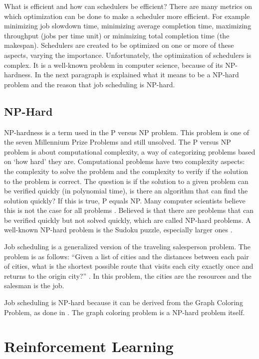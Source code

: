 What is efficient and how can schedulers be efficient? There are many metrics
on which optimization can be done to make a scheduler more efficient. For
example minimizing job slowdown time, minimizing average completion time,
maximizing throughput (jobs per time unit) or minimizing total completion time
(the makespan). Schedulers are created to be optimized on one or more of these
aspects, varying the importance. Unfortunately, the optimization of schedulers
is complex. It is a well-known problem in computer science, because of its
NP-hardness. In the next paragraph is explained what it means to be a NP-hard
problem and the reason that job scheduling is NP-hard.


\subsection{NP-Hard}

NP-hardness is a term used in the P versus NP problem. This problem is one of
the seven Millennium Prize Problems \cite{carlson2006} and still unsolved. The
P versus NP problem is about computational complexity, a way of categorizing
problems based on `how hard' they are. Computational problems have two
complexity aspects: the complexity to solve the problem and the complexity to
verify if the solution to the problem is correct. The question is if the
solution to a given problem can be verified quickly (in polynomial time), is
there an algorithm that can find the solution quickly? If this is true, P
equals NP. Many computer scientists believe this is not the case for all
problems \cite{rosenberger2012}. Believed is that there are problems that can
be verified quickly but not solved quickly, which are called NP-hard problems.
A well-known NP-hard problem is the Sudoku puzzle, especially larger ones
\cite{yato2003}.

Job scheduling is a generalized version of the traveling salesperson problem.
The problem is as follows: ``Given a list of cities and the distances between
each pair of cities, what is the shortest possible route that visits each city
exactly once and returns to the origin city?'' \cite{flood1956}. In this
problem, the cities are the resources and the salesman is the job.

Job scheduling is NP-hard because it can be derived from the Graph Coloring
Problem, as done in . The graph coloring problem is a NP-hard
problem itself.


\section{Reinforcement Learning}\label{sec:rl}

